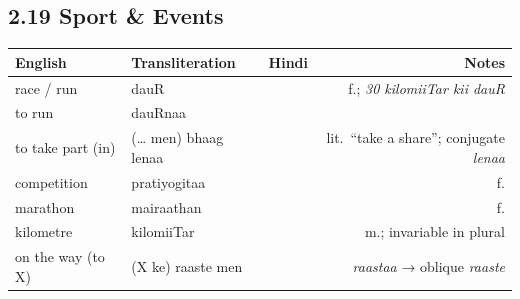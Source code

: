 \subsection{2.19 Sport \& Events}

\begin{tabular}{@{}VTDN@{}}
  \toprule
  English & Transliteration & Hindi & Notes \\
  \midrule
  race / run       & dauR          &              & f.; \textit{30 kilomiiTar kii dauR} \\
  to run           & dauRnaa       &            & \\
  to take part (in) & (\ldots{} men) bhaag lenaa &  & lit.\ ``take a share''; conjugate \textit{lenaa} \\
  competition      & pratiyogitaa  &       & f. \\
  marathon         & mairaathan    &            & f. \\
  kilometre        & kilomiiTar    &          & m.; invariable in plural \\
  on the way (to X) & (X ke) raaste men &  & \textit{raastaa} → oblique \textit{raaste} \\
  \bottomrule
\end{tabular}

